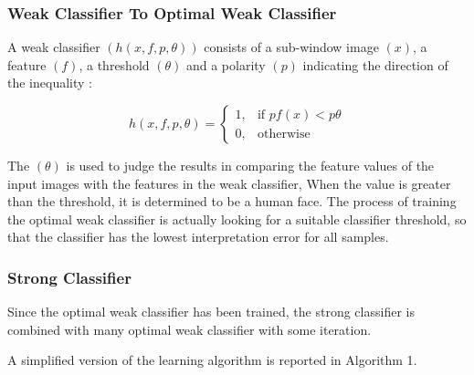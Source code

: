 \documentclass[conference]{IEEEtran}
\begin{document}
\subsubsection{Weak Classifier To Optimal Weak Classifier}
A weak classifier $(h(x, f, p, \theta))$ consists of a sub-window image $(x)$, a feature $(f)$, a threshold $(\theta)$ and a polarity $(p)$ indicating the direction of the inequality \cite{b2}:

\begin{equation}
  h(x, f, p, \theta)= \begin{cases}
    1, & \text{if } pf(x)<p\theta\\
    0, & \text{otherwise}
  \end{cases}
\end{equation}

The $(\theta)$ is used to judge the results in comparing the feature values of the input images with the features in the weak classifier, When the value is greater than the threshold, it is determined to be a human face. The process of training the optimal weak classifier is actually looking for a suitable classifier threshold, so that the classifier has the lowest interpretation error for all samples.

\subsubsection{Strong Classifier}
Since the optimal weak classifier has been trained, the strong classifier is combined with many optimal weak classifier with some iteration.

A simplified version of the learning algorithm is reported in Algorithm 1\cite{b3}.
\end{document}
